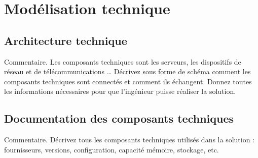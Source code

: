 \section{Modélisation technique}

\subsection{Architecture technique}
Commentaire.  Les composants techniques sont les serveurs, les dispositifs de réseau et de télécommunications …  Décrivez sous forme de schéma comment les composants techniques sont connectés et comment ils échangent.  Donnez toutes les informations nécessaires pour que l’ingénieur puisse réaliser la solution.

\subsection{Documentation des composants techniques}
Commentaire.  Décrivez tous les composants techniques utilisés dans la solution : fournisseurs, versions, configuration, capacité mémoire, stockage, etc.  